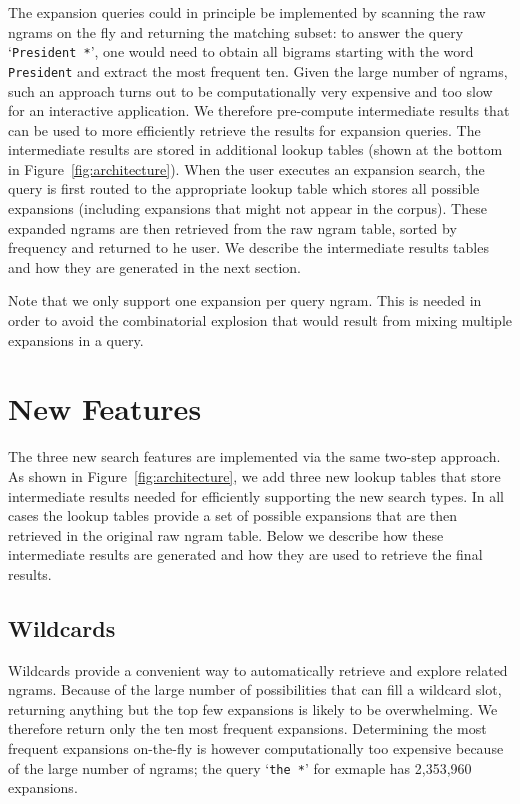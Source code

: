 \documentclass[11pt,a4paper]{article}
\newcommand{\query}[1]{\texttt{#1}}
\begin{document}
The expansion queries could in principle be implemented by scanning the raw ngrams on the fly and returning the matching subset: to answer the query `\query{President *}', one would need to obtain all bigrams starting with the word \query{President} and extract the most frequent ten. Given the large number of ngrams, such an approach turns out to be computationally very expensive and too slow for an interactive application. We therefore pre-compute intermediate results that can be used to more efficiently retrieve the results for expansion queries. The intermediate results are stored in additional lookup tables (shown at the bottom in Figure~\ref{fig:architecture}). When the user executes an expansion search, the query is first routed to the appropriate lookup table which stores all possible expansions (including expansions that might not appear in the corpus).  These expanded ngrams are then retrieved from the raw ngram table, sorted by frequency and returned to he user.
We describe the intermediate results tables and how they are generated in the next section.

Note that we only support one expansion per query ngram. This is needed in order to avoid the combinatorial explosion that would result from mixing multiple expansions in a query.


\section{New Features}
\label{sec:features}
The three new search features are implemented via the same two-step approach. As shown in Figure~\ref{fig:architecture}, we add three new lookup tables that store intermediate results needed for efficiently supporting the new search types. In all cases the lookup tables provide a set of possible expansions that are then retrieved in the original raw ngram table. Below we describe how these intermediate results are generated and how they are used to retrieve the final results.

\subsection{Wildcards}
\label{sec:wildcards}
	Wildcards provide a convenient way to automatically retrieve and explore related ngrams. Because of the large number of possibilities that can fill a wildcard slot, returning anything but the top few expansions is likely to be overwhelming. We therefore return only the ten most frequent expansions. Determining the most frequent expansions on-the-fly is however computationally too expensive because of the large number of ngrams; the query `\query{the *}' for exmaple has 2,353,960 expansions.
\end{document}
